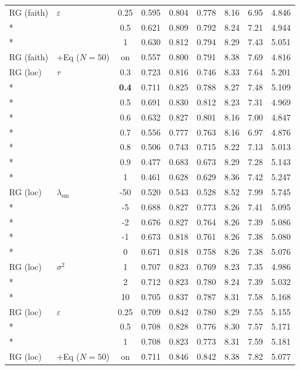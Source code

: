 \begin{longtable}{@{}l l c c c c c c c@{}}
\midrule
RG (faith) & $\varepsilon$ & 0.25 & 0.595 & 0.804 & 0.778 & 8.16 & 6.95 & 4.846 \\*
 &  & 0.5 & 0.621 & 0.809 & 0.792 & 8.24 & 7.21 & 4.944 \\*
 &  & 1 & 0.630 & 0.812 & 0.794 & 8.29 & 7.43 & 5.051 \\
\midrule
RG (faith) & +Eq ($N{=}50$) & on & 0.557 & 0.800 & 0.791 & 8.38 & 7.69 & 4.816 \\
\midrule
RG (loc) & $\tau$ & 0.3 & 0.723 & 0.816 & 0.746 & 8.33 & 7.64 & 5.201 \\*
 &  & \textbf{0.4} & 0.711 & 0.825 & 0.788 & 8.27 & 7.48 & 5.109 \\*
 &  & 0.5 & 0.691 & 0.830 & 0.812 & 8.23 & 7.31 & 4.969 \\*
 &  & 0.6 & 0.632 & 0.827 & 0.801 & 8.16 & 7.00 & 4.847 \\*
 &  & 0.7 & 0.556 & 0.777 & 0.763 & 8.16 & 6.97 & 4.876 \\*
 &  & 0.8 & 0.506 & 0.743 & 0.715 & 8.22 & 7.13 & 5.013 \\*
 &  & 0.9 & 0.477 & 0.683 & 0.673 & 8.29 & 7.28 & 5.143 \\*
 &  & 1 & 0.461 & 0.628 & 0.629 & 8.36 & 7.42 & 5.247 \\
\midrule
RG (loc) & $\lambda_{\mathrm{sm}}$ & {-}50 & 0.520 & 0.543 & 0.528 & 8.52 & 7.99 & 5.745 \\*
 &  & {-}5 & 0.688 & 0.827 & 0.773 & 8.26 & 7.41 & 5.095 \\*
 &  & {-}2 & 0.676 & 0.827 & 0.764 & 8.26 & 7.39 & 5.086 \\*
 &  & {-}1 & 0.673 & 0.818 & 0.761 & 8.26 & 7.38 & 5.080 \\*
 &  & 0 & 0.671 & 0.818 & 0.758 & 8.26 & 7.38 & 5.076 \\
\midrule
RG (loc) & $\sigma^2$ & 1 & 0.707 & 0.823 & 0.769 & 8.23 & 7.35 & 4.986 \\*
 &  & 2 & 0.712 & 0.823 & 0.780 & 8.24 & 7.39 & 5.032 \\*
 &  & 10 & 0.705 & 0.837 & 0.787 & 8.31 & 7.58 & 5.168 \\
\midrule
RG (loc) & $\varepsilon$ & 0.25 & 0.709 & 0.842 & 0.780 & 8.29 & 7.55 & 5.155 \\*
 &  & 0.5 & 0.708 & 0.828 & 0.776 & 8.30 & 7.57 & 5.171 \\*
 &  & 1 & 0.708 & 0.823 & 0.773 & 8.31 & 7.59 & 5.181 \\
\midrule
RG (loc) & +Eq ($N{=}50$) & on & 0.711 & 0.846 & 0.842 & 8.38 & 7.82 & 5.077 \\

\end{longtable}
